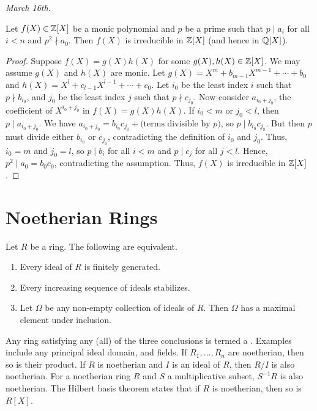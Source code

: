 \textit{March 16th.}

\begin{theorem}
    Let $f(X) \in \mathbb{Z}[X]$ be a monic polynomial and $p$ be a prime such that $p \mid a_{i}$ for all $i < n$ and $p^{2} \nmid a_{0}$. Then $f(X)$ is irreducible in $\mathbb{Z}[X]$ (and hence in $\mathbb{Q}[X]$).
\end{theorem}
\begin{proof}
    Suppose $f(X) = g(X) h(X)$ for some $g(X),h(X) \in \mathbb{Z}[X]$. We may assume $g(X)$ and $h(X)$ are monic. Let $g(X) = X^{m} + b_{m-1} X^{m-1} + \cdots + b_{0}$ and $h(X) = X^{l} + c_{l-1} X^{l-1} + \cdots + c_{0}$. Let $i_{0}$ be the least index $i$ such that $p \nmid b_{i_{0}}$, and $j_{0}$ be the least index $j$ such that $p \nmid c_{j_{0}}$. Now consider $a_{i_{0}+j_{0}}$, the coefficient of $X^{i_{0}+j_{0}}$ in $f(X) = g(X)h(X)$. If $i_{0} < m$ or $j_{0} < l$, then $p \mid a_{i_{0}+j_{0}}$. We have $a_{i_{0}+j_{0}} = b_{i_{0}} c_{j_{0}} + \text{(terms divisible by $p$)}$, so $p \mid b_{i_{0}} c_{j_{0}}$. But then $p$ must divide either $b_{i_{0}}$ or $c_{j_{0}}$, contradicting the definition of $i_{0}$ and $j_{0}$. Thus, $i_{0} = m$ and $j_{0} = l$, so $p \mid b_{i}$ for all $i < m$ and $p \mid c_{j}$ for all $j < l$. Hence, $p^{2} \mid a_{0} = b_{0} c_{0}$, contradicting the assumption. Thus, $f(X)$ is irreducible in $\mathbb{Z}[X]$.
\end{proof}


\section{Noetherian Rings}

\begin{proposition}
    Let $R$ be a ring. The following are equivalent.
    \begin{enumerate}
        \item Every ideal of $R$ is finitely generated.
        \item Every increasing sequence of ideals stabilizes.
        \item Let $\Omega$ be any non-empty collection of ideals of $R$. Then $\Omega$ has a maximal element under inclusion.
    \end{enumerate}
\end{proposition}
Any ring satisfying any (all) of the three conclusions is termed a . Examples include any principal ideal domain, and fields. If $R_{1},\ldots,R_{n}$ are noetherian, then so is their product. If $R$ is noetherian and $I$ is an ideal of $R$, then $R/I$ is also noetherian. For a noetherian ring $R$ and $S$ a multiplicative subset, $S^{-1}R$ is also noetherian. The Hilbert basis theorem states that if $R$ is noetherian, then so is $R[X]$.

